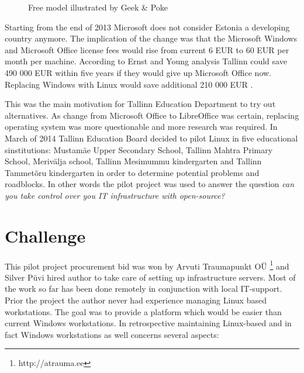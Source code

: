 \documentclass{article}
\begin{document}
\begin{figure}[!htb]
\centering
{}
\caption{Free model illustrated by Geek \& Poke}
\label{fig:free-model}
\end{figure}






Starting from the end of 2013 Microsoft does not consider Estonia a
developing country anymore. The implication of the change was that
the Microsoft Windows and Microsoft Office license fees would rise
from current 6 EUR to 60 EUR per month per machine.
According to Ernst and Young analysis Tallinn could save 490 000 EUR
within five years if they would give up Microsoft Office now.
Replacing Windows with Linux would save additional 210 000 EUR
\cite{ernst-young-report}.

This was the main motivation for Tallinn Education Department to try
out alternatives.
As change from Microsoft Office to LibreOffice was
certain, replacing operating system was more questionable and
more research was required.
In March of 2014 Tallinn Education Board decided
to pilot Linux in five educational sinstitutions:
Mustamäe Upper Secondary School,
Tallinn Mahtra Primary School,
Merivälja school,
Tallinn Mesimummu kindergarten and
Tallinn Tammetõru kindergarten in order
to determine potential problems and roadblocks.
In other words the pilot project was used to answer
the question \emph{can you take control over you IT infrastructure
with open-source?}

\section{Challenge}

This pilot project procurement bid was won by Arvuti Traumapunkt OÜ
\footnote{http://atrauma.ee} and
Silver Püvi hired author to take care of setting up infrastructure servers.
Most of the work so far has been done remotely in conjunction with
local IT-support.
Prior the project the author never had experience managing Linux based workstations.
The goal was to provide a platform which would be easier than current Windows
workstations.
In retrospective maintaining Linux-based and in fact
Windows workstations as well concerns several aspects:
\end{document}
